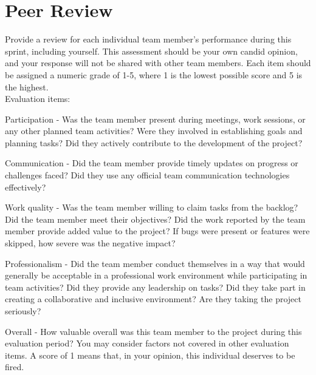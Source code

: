 \documentclass{article}
\begin{document}
\section{Peer Review}
Provide a review for each individual team member's performance during this sprint, including yourself. This assessment should be your own candid opinion, and your response will not be shared with other team members. Each item should be assigned a numeric grade of 1-5, where 1 is the lowest possible score and 5 is the highest. \\

Evaluation items:
\begin{itemize}
\begin{item}
Participation - Was the team member present during meetings, work sessions, or any other planned team activities? Were they involved in establishing goals and planning tasks? Did they actively contribute to the development of the project? 
\end{item}
\begin{item}
Communication - Did the team member provide timely updates on progress or challenges faced? Did they use any official team communication technologies effectively? 
\end{item}
\begin{item}
Work quality - Was the team member willing to claim tasks from the backlog? Did the team member meet their objectives? Did the work reported by the team member provide added value to the project? If bugs were present or features were skipped, how severe was the negative impact? 
\end{item}
\begin{item}
Professionalism - Did the team member conduct themselves in a way that would generally be acceptable in a professional work environment while participating in team activities? Did they provide any leadership on tasks? Did they take part in creating a collaborative and inclusive environment? Are they taking the project seriously?
\end{item}
\begin{item}
Overall - How valuable overall was this team member to the project during this evaluation period? You may consider factors not covered in other evaluation items. A score of 1 means that, in your opinion, this individual deserves to be fired.
\end{item}
\end{itemize}
\end{document}
